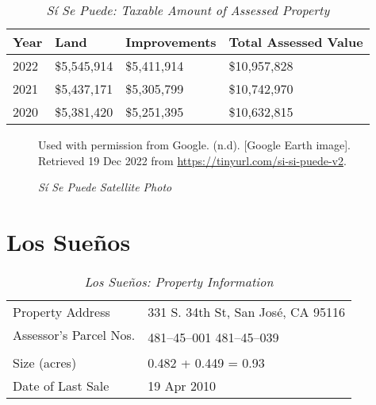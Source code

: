 \begin{table}[htbp]
  \SingleSpacing%
  \caption[Sí Se Puede: Taxable Amount of Assessed Property]{\textit{Sí Se Puede: Taxable Amount of Assessed Property}}%
  \label{tab:sí-se-puede-taxable-amount}
  \begin{tabular}{llll}
    \toprule
    Year & Land        & Improvements & Total Assessed Value \\
    \midrule
    2022 & \$5,545,914 & \$5,411,914  & \$10,957,828 \\
    2021 & \$5,437,171 & \$5,305,799  & \$10,742,970 \\
    2020 & \$5,381,420 & \$5,251,395  & \$10,632,815 \\
    \bottomrule
  \end{tabular}
\end{table}

\begin{figure}[hbtp]
  \caption[Sí Se Puede Satellite Photo]{\textit{Sí Se Puede Satellite Photo}}%
  \label{fig:sí-se-puede-sat-photo}
  {Used with permission from Google. (n.d). [Google Earth image]. Retrieved 19 Dec 2022 from \url{https://tinyurl.com/si-si-puede-v2}.}
\end{figure}


\clearpage
\section{Los Sueños}\label{sec:los-suenos-info}\indent

\begin{table}[htbp]
  \SingleSpacing%
  \caption[Los Sueños: Property Information]{\textit{Los Sueños: Property Information}}%
  \label{tab:los-sueños-prop-info}
  \begin{tabular}{ll}
    \toprule
    Property Address       & 331 S. 34th St, San José, CA 95116 \\
    Assessor's Parcel Nos. & \multirow[t]{2}{1in}{481–45–001 481–45–039} \\
    \\
    Size (acres)           & 0.482 + 0.449 = 0.93 \\
    Date of Last Sale      & 19 Apr 2010 \\
    \bottomrule
  \end{tabular}
\end{table}

